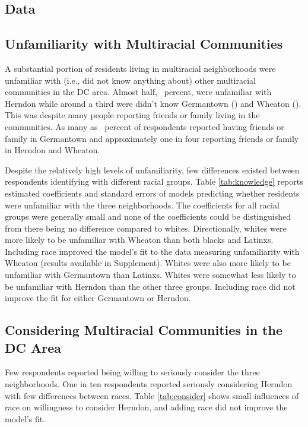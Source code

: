 \documentclass{baderart}
\begin{document}
\subsection{Data}\label{data}


\subsection{Unfamiliarity with Multiracial Communities}\label{unfamiliarity-with-multiracial-communities}

A substantial portion of residents living in multiracial neighborhoods were unfamiliar with (i.e., did not know anything about) other multiracial communities in the DC area. Almost half, \dkherndon~percent, were unfamiliar with Herndon while around a third were didn't know Germantown (\dkgermantown) and Wheaton (\dkwheaton). This was despite many people reporting friends or family living in the communities. As many as \ffgermantown~percent of respondents reported having friends or family in Germantown and approximately one in four reporting friends or family in Herndon and Wheaton.

Despite the relatively high levels of unfamiliarity, few differences existed between respondents identifying with different racial groups. Table \ref{tab:knowledge} reports estimated coefficients and standard errors of models predicting whether residents were unfamiliar with the three neighborhoods. The coefficients for all racial groups were generally small and none of the coefficients could be distinguished from there being no difference compared to whites. Directionally, whites were more likely to be unfamiliar with Wheaton than both blacks and Latinxs. Including race improved the model's fit to the data measuring unfamiliarity with Wheaton (results available in Supplement). Whites were also more likely to be unfamiliar with Germantown than Latinxs. Whites were somewhat less likely to be unfamiliar with Herndon than the other three groups. Including race did not improve the fit for either Germantown or Herndon. 


\subsection{Considering Multiracial Communities in the DC Area}
Few respondents reported being willing to seriously consider the three neighborhoods. One in ten respondents reported seriously considering Herndon with few differences between races. Table \ref{tab:consider} shows small influences of race on willingness to consider Herndon, and adding race did not improve the model's fit. 
\end{document}
